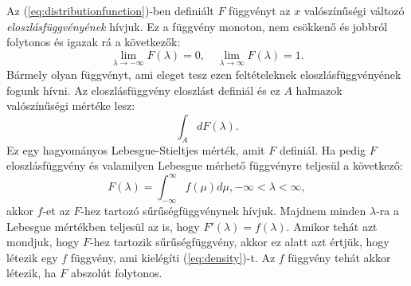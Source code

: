 \documentclass{article}
\begin{document}
Az (\ref{eq:distributionfunction})-ben definiált $F$ függvényt az $x$ valószínűségi változó \textit{eloszlásfüggvényének} hívjuk. Ez a függvény monoton, nem csökkenő és jobbról folytonos és igazak rá a következők:
\begin{equation}
	\lim_{\lambda \to -\infty} F(\lambda) = 0, \quad \lim_{\lambda \to \infty} F(\lambda) = 1 .
\end{equation}
Bármely olyan függvényt, ami eleget tesz ezen feltételeknek eloszlásfüggvényének fogunk hívni. Az eloszlásfüggvény eloszlást definiál és ez $A$ halmazok valószínűségi mértéke lesz:
\begin{equation}
 \int_{A} dF(\lambda) .
\end{equation}
Ez egy hagyományos Lebesgue-Stieltjes mérték, amit $F$ definiál. Ha pedig $F$ eloszlásfüggvény és valamilyen Lebesgue mérhető függvényre teljesül a következő:
\begin{equation}
	F(\lambda) = \int^{\infty}_{-\infty} f(\mu) d\mu, -\infty < \lambda < \infty,
	\label{eq:density}
\end{equation}
akkor $f$-et az $F$-hez tartozó sűrűségfüggvénynek hívjuk. Majdnem minden $\lambda$-ra a Lebesgue mértékben teljesül az is, hogy $F'(\lambda) = f(\lambda)$. Amikor tehát azt mondjuk, hogy $F$-hez tartozik sűrűségfüggvény, akkor ez alatt azt értjük, hogy létezik egy $f$ függvény, ami kielégíti (\ref{eq:density})-t. Az $f$ függvény tehát akkor létezik, ha $F$ abszolút folytonos. 
\end{document}
